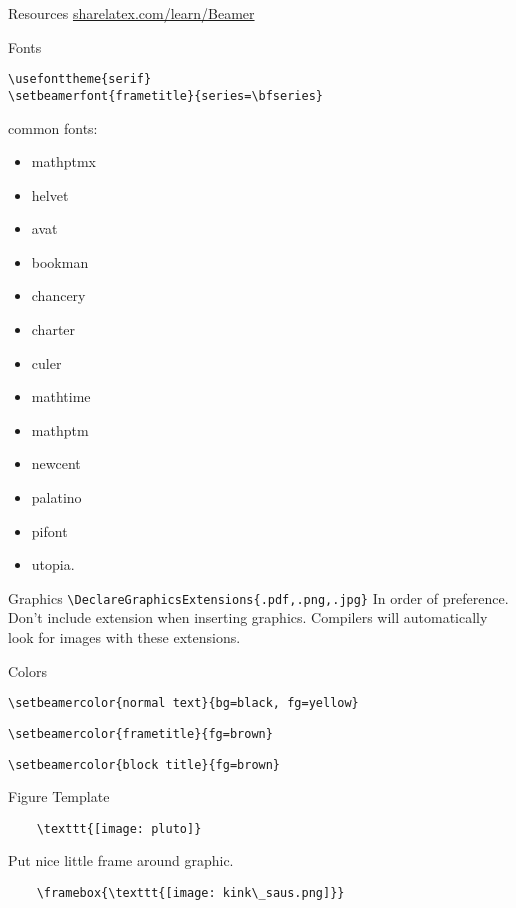 \documentclass[9pt]{beamer}
\begin{document}
\begin{frame}[fragile=singleslide]{Resources}
    \url{sharelatex.com/learn/Beamer}
\end{frame}%
\begin{frame}[fragile=singleslide]{Fonts}
    \begin{verbatim}
\usefonttheme{serif}
\setbeamerfont{frametitle}{series=\bfseries}
    \end{verbatim}
common fonts:
    \begin{itemize}
        \item mathptmx
        \item helvet
        \item avat
        \item bookman
        \item chancery
        \item charter
        \item culer
        \item mathtime
        \item mathptm
        \item newcent
        \item palatino
        \item pifont
        \item utopia.
    \end{itemize}
\end{frame}%
\begin{frame}[fragile=singleslide]{Graphics}
    \verb|\DeclareGraphicsExtensions{.pdf,.png,.jpg}|
    In order of preference. Don't include extension when inserting
    graphics. Compilers will automatically look for images with these
    extensions.
\end{frame}%
\begin{frame}[fragile=singleslide]{Colors}
    \begin{list}{}
        \item \verb|\setbeamercolor{normal text}{bg=black, fg=yellow}|
        \item \verb|\setbeamercolor{frametitle}{fg=brown}|
        \item \verb|\setbeamercolor{block title}{fg=brown}|
    \end{list}
\end{frame}%
\begin{frame}[fragile=singleslide]{Figure Template}
    \begin{verbatim}
    \texttt{[image: pluto]}
    \end{verbatim}
    Put nice little frame around graphic.
    \begin{verbatim}
    \framebox{\texttt{[image: kink\_saus.png]}}
    \end{verbatim}
\end{frame}%
\end{document}

